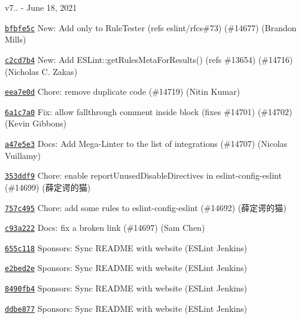 v7.. -\/ June 18, 2021


\begin{DoxyItemize}
\item \href{https://github.com/eslint/eslint/commit/bfbfe5c1fd4c39a06d5e159dbe48479ca4305fc0}{\texttt{ {\ttfamily bfbfe5c}}} New\+: Add only to Rule\+Tester (refs eslint/rfcs\#73) (\#14677) (Brandon Mills)
\item \href{https://github.com/eslint/eslint/commit/c2cd7b4a18057ca6067bdfc16de771dc5d90c0ea}{\texttt{ {\ttfamily c2cd7b4}}} New\+: Add ESLint\+::get\+Rules\+Meta\+For\+Results() (refs \#13654) (\#14716) (Nicholas C. Zakas)
\item \href{https://github.com/eslint/eslint/commit/eea7e0d09d6ef43d6663cbe424e7974764a5f7fe}{\texttt{ {\ttfamily eea7e0d}}} Chore\+: remove duplicate code (\#14719) (Nitin Kumar)
\item \href{https://github.com/eslint/eslint/commit/6a1c7a0dac050ea5876972c50563a7eb867b38d3}{\texttt{ {\ttfamily 6a1c7a0}}} Fix\+: allow fallthrough comment inside block (fixes \#14701) (\#14702) (Kevin Gibbons)
\item \href{https://github.com/eslint/eslint/commit/a47e5e30b0da364593b6881f6826c595da8696f5}{\texttt{ {\ttfamily a47e5e3}}} Docs\+: Add Mega-\/\+Linter to the list of integrations (\#14707) (Nicolas Vuillamy)
\item \href{https://github.com/eslint/eslint/commit/353ddf965078030794419b089994373e27ffc86e}{\texttt{ {\ttfamily 353ddf9}}} Chore\+: enable report\+Unused\+Disable\+Directives in eslint-\/config-\/eslint (\#14699) (薛定谔的猫)
\item \href{https://github.com/eslint/eslint/commit/757c49584a5852c468c1b4a0b74ad3aa39d954e5}{\texttt{ {\ttfamily 757c495}}} Chore\+: add some rules to eslint-\/config-\/eslint (\#14692) (薛定谔的猫)
\item \href{https://github.com/eslint/eslint/commit/c93a222563177a9b5bc7a59aa106bc0a6d31e063}{\texttt{ {\ttfamily c93a222}}} Docs\+: fix a broken link (\#14697) (Sam Chen)
\item \href{https://github.com/eslint/eslint/commit/655c1187fc845bac61ae8d06c556f1a59ee2071b}{\texttt{ {\ttfamily 655c118}}} Sponsors\+: Sync README with website (ESLint Jenkins)
\item \href{https://github.com/eslint/eslint/commit/e2bed2ead22b575d55ccaeed94eecd3a979dd871}{\texttt{ {\ttfamily e2bed2e}}} Sponsors\+: Sync README with website (ESLint Jenkins)
\item \href{https://github.com/eslint/eslint/commit/8490fb42e559ef0b3c34ac60be4e05e0d879a9cb}{\texttt{ {\ttfamily 8490fb4}}} Sponsors\+: Sync README with website (ESLint Jenkins)
\item \href{https://github.com/eslint/eslint/commit/ddbe877c95224e127215d35562a175c6f2b7ba22}{\texttt{ {\ttfamily ddbe877}}} Sponsors\+: Sync README with website (ESLint Jenkins)
\end{DoxyItemize}

